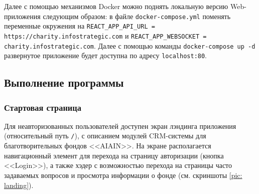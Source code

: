 \documentclass[a4paper,12pt,reqno]{article}
\begin{document}
    Далее с помощью механизмов Docker можно поднять локальную версию Web-приложения следующим образом: в файле \texttt{docker-compose.yml} поменять переменные окружения на \texttt{REACT\_APP\_API\_URL = https://charity.infostrategic.com} и  \texttt{REACT\_APP\_WEBSOCKET = charity.infostrategic.com}. Далее с помощью команды \texttt{docker-compose up -d} развернутое приложение будет доступна по адресу \texttt{localhost:80}.
	
	\subsection{Выполнение программы}
	
	\subsubsection{Стартовая страница}
	
	Для неавторизованных пользователей доступен экран лэндинга приложения (относительный путь \texttt{/}), с описанием модулей CRM-системы для благотворительных фондов <<AIAIN>>. На экране располагается навигационный элемент для перехода на страницу авторизации (кнопка <<Login>>), а также хэдер с возможностью перехода на страницы часто задаваемых вопросов и просмотра информации о фонде (см. скриншоты \ref{pic: landing}).
	
\end{document}

